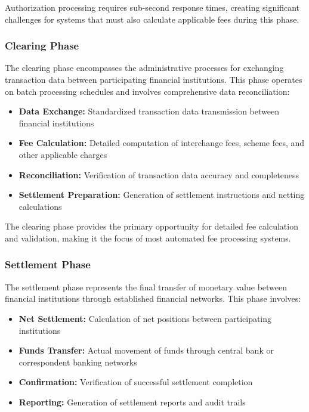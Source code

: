 Authorization processing requires sub-second response times, creating significant challenges for systems that must also calculate applicable fees during this phase.

\subsubsection{Clearing Phase}

The clearing phase encompasses the administrative processes for exchanging transaction data between participating financial institutions. This phase operates on batch processing schedules and involves comprehensive data reconciliation:

\begin{itemize}
   \item \textbf{Data Exchange:} Standardized transaction data transmission between financial institutions
   \item \textbf{Fee Calculation:} Detailed computation of interchange fees, scheme fees, and other applicable charges
   \item \textbf{Reconciliation:} Verification of transaction data accuracy and completeness
   \item \textbf{Settlement Preparation:} Generation of settlement instructions and netting calculations
\end{itemize}

The clearing phase provides the primary opportunity for detailed fee calculation and validation, making it the focus of most automated fee processing systems.

\subsubsection{Settlement Phase}

The settlement phase represents the final transfer of monetary value between financial institutions through established financial networks. This phase involves:

\begin{itemize}
   \item \textbf{Net Settlement:} Calculation of net positions between participating institutions
   \item \textbf{Funds Transfer:} Actual movement of funds through central bank or correspondent banking networks
   \item \textbf{Confirmation:} Verification of successful settlement completion
   \item \textbf{Reporting:} Generation of settlement reports and audit trails
\end{itemize}

